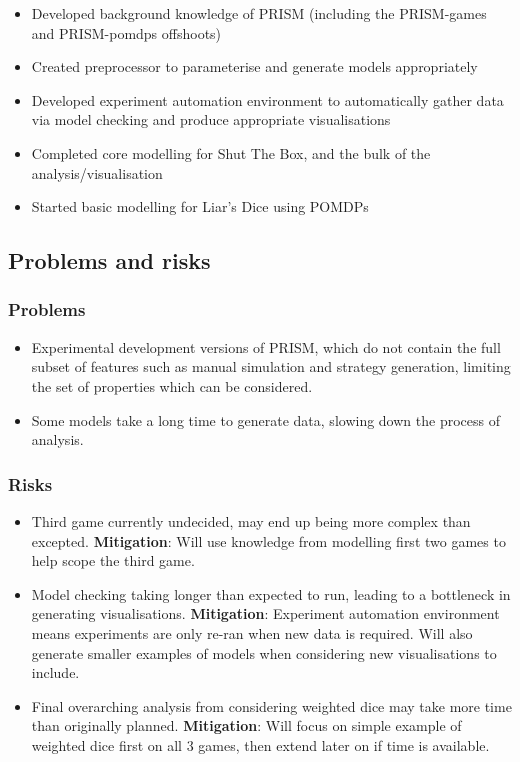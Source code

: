 \documentclass[11pt]{article}
\begin{document}
\begin{itemize}
    \item Developed background knowledge of PRISM (including the PRISM-games and PRISM-pomdps offshoots)
    \item Created preprocessor to parameterise and generate models appropriately
    \item Developed experiment automation environment to automatically gather data via model checking and produce appropriate visualisations
    \item Completed core modelling for Shut The Box, and the bulk of the analysis/visualisation
    \item Started basic modelling for Liar's Dice using POMDPs
\end{itemize}

\subsection{Problems and risks}\label{problems-and-risks}

\subsubsection{Problems}\label{problems}


\begin{itemize}
\item Experimental development versions of PRISM, which do not contain the full subset of features such as manual simulation and strategy generation, limiting the set of properties which can be considered.
\item Some models take a long time to generate data, slowing down the process of analysis.
\end{itemize}

\subsubsection{Risks}\label{risks}

\begin{itemize}

\item Third game currently undecided, may end up being more complex than excepted. \textbf{Mitigation}: Will use knowledge from modelling first two games to help scope the third game.
\item Model checking taking longer than expected to run, leading to a bottleneck in generating visualisations. \textbf{Mitigation}: Experiment automation environment means experiments are only re-ran when new data is required. Will also generate smaller examples of models when considering new visualisations to include.
\item Final overarching analysis from considering weighted dice may take more time than originally planned. \textbf{Mitigation}: Will focus on simple example of weighted dice first on all 3 games, then extend later on if time is available.
\end{itemize}
\end{document}
